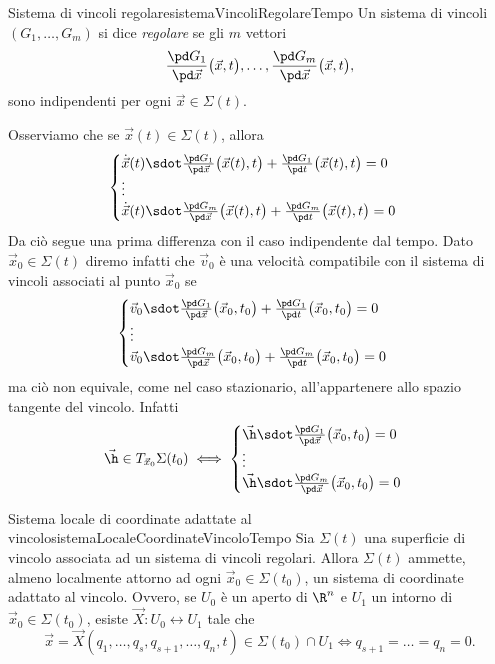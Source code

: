 \begin{defn}{Sistema di vincoli regolare}{sistemaVincoliRegolareTempo}
	Un sistema di vincoli \((G_1,\ldots,G_m)\) si dice \emph{regolare} se gli \(m\) vettori
	\[
		\frac{\pd G_1}{\pd\vec{x}}\big(\vec{x},t\big), \ldots, \frac{\pd G_m}{\pd\vec{x}}\big(\vec{x},t\big),
	\]
	sono indipendenti per ogni \(\vec{x}\in\Sigma(t)\).
\end{defn}
\noindent
Osserviamo che se \(\vec{x}(t)\in\Sigma(t)\), allora
\[
	\begin{cases}
		\dot{\vec{x}}(t) \sdot \frac{\pd G_1}{\pd\vec{x}}\big(\vec{x}(t),t\big) + \frac{\pd G_1}{\pd t}\big(\vec{x}(t),t\big) = 0 \\
		\vdots                                                                                                                    \\
		\dot{\vec{x}}(t) \sdot \frac{\pd G_m}{\pd\vec{x}}\big(\vec{x}(t),t\big) + \frac{\pd G_m}{\pd t}\big(\vec{x}(t),t\big) = 0
	\end{cases}
\]
Da ciò segue una prima differenza con il caso indipendente dal tempo. Dato \(\vec{x}_0\in\Sigma(t)\) diremo infatti che \(\vec{v}_0\) è una velocità compatibile con il sistema di vincoli associati al punto \(\vec{x}_0\) se
\[
	\begin{cases}
		\vec{v}_0 \sdot \frac{\pd G_1}{\pd\vec{x}}\big(\vec{x}_0,t_0\big) + \frac{\pd G_1}{\pd t}\big(\vec{x}_0,t_0\big) = 0 \\
		\vdots                                                                                                               \\
		\vec{v}_0 \sdot \frac{\pd G_m}{\pd\vec{x}}\big(\vec{x}_0,t_0\big) + \frac{\pd G_m}{\pd t}\big(\vec{x}_0,t_0\big) = 0
	\end{cases}
\]
ma ciò non equivale, come nel caso stazionario, all'appartenere allo spazio tangente del vincolo. Infatti
\[
	\vec{\h} \in T_{\vec{x}_0}\Sigma(t_0) \iff 	\begin{cases}
		\vec{\h} \sdot \frac{\pd G_1}{\pd \vec{x}}\big(\vec{x}_0,t_0\big) = 0 \\
		\vdots                                                                \\
		\vec{\h} \sdot \frac{\pd G_m}{\pd \vec{x}}\big(\vec{x}_0,t_0\big) = 0
	\end{cases}
\]

\begin{teor}{Sistema locale di coordinate adattate al vincolo}{sistemaLocaleCoordinateVincoloTempo}
	Sia \(\Sigma(t)\) una superficie di vincolo associata ad un sistema di vincoli regolari.
	Allora \(\Sigma(t)\) ammette, almeno localmente attorno ad ogni \(\vec{x}_0\in\Sigma(t_0)\), un sistema di coordinate adattato al vincolo.
	Ovvero, se \(U_0\) è un aperto di \(\R^n\) e \(U_1\) un intorno di \(\vec{x}_0\in\Sigma(t_0)\), esiste \(\vec{X}\colon U_0 \longleftrightarrow U_1\) tale che
	\[
		\vec{x} = \vec{X}(q_1,\ldots,q_s,q_{s+1},\ldots,q_n,t) \in \Sigma(t_0)\cap U_1 \iff q_{s+1} = \ldots = q_n = 0.
	\]
\end{teor}

